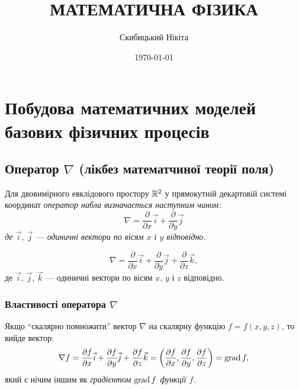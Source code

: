 

\title{{\Huge МАТЕМАТИЧНА ФІЗИКА}}
\author{Скибицький Нікіта}
\date{\today}




\tableofcontents

\setcounter{section}{2}

\section{Побудова математичних моделей базових фізичних процесів}

\setcounter{subsection}{-1}
\subsection{Оператор \texorpdfstring{$\nabla$}{nabla} (лікбез математчиної теорії поля)}

\begin{definition}
    Для двовимірного евклідового простору $\mathbb{R}^2$ у прямокутній декартовій системі координат \it{оператор набла} визначається наступним чином:
    \begin{equation}
    	\nabla = \frac{\partial}{\partial x} \vec{i} + \frac{\partial}{\partial y} \vec{j}
    \end{equation}
    де $\vec{i}$, $\vec{j}$ --- одиничні вектори по вісям $x$ і $y$ відповідно.
\end{definition}

\begin{definition}
    \begin{equation}
    	\nabla = \frac{\partial}{\partial x} \vec{i} + \frac{\partial}{\partial y} \vec{j} + \frac{\partial}{\partial z} \vec{k},
    \end{equation}
    де $\vec{i}$, $\vec{j}$, $\vec{k}$ --- одиничні вектори по вісям $x$, $y$ і $z$ відповідно.
\end{definition}

\subsubsection{Властивості оператора \texorpdfstring{$\nabla$}{nabla}}

\begin{definition}
	Якщо ``скалярно помножити'' вектор $\nabla$ на скалярну функцію $f = f(x, y, z)$, то вийде вектор:
	\begin{equation}
    	\nabla f = \frac{\partial f}{\partial x} \vec{i} + \frac{\partial f}{\partial y} \vec{j} + \frac{\partial f}{\partial z} \vec{k} = \left( \frac{\partial f}{\partial x}, \frac{\partial f}{\partial y}, \frac{\partial f}{\partial z} \right) = \operatorname{grad} f,
    \end{equation}
    який є нічим іншим як \it{градієнтом} $\operatorname{grad} f$ функції $f$.
\end{definition}


